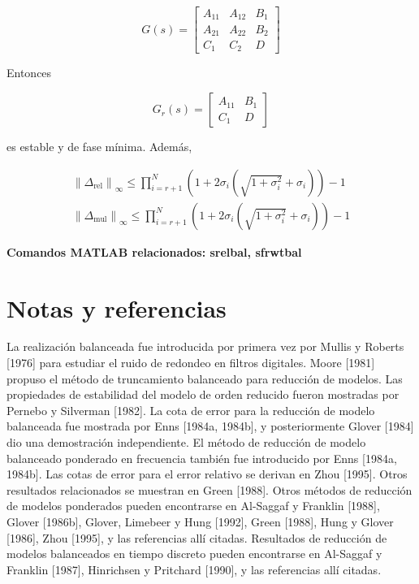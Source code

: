 $$
G(s)=\left[\begin{array}{cc|c}
A_{11} & A_{12} & B_{1} \\
A_{21} & A_{22} & B_{2} \\
\hline C_{1} & C_{2} & D
\end{array}\right]
$$

Entonces

$$
G_{r}(s)=\left[\begin{array}{c|c}
A_{11} & B_{1} \\
\hline C_{1} & D
\end{array}\right]
$$

es estable y de fase mínima. Además,

$$
\begin{gathered}
\left\|\Delta_{\mathrm{rel}}\right\|_{\infty} \leq \prod_{i=r+1}^{N}\left(1+2 \sigma_{i}\left(\sqrt{1+\sigma_{i}^{2}}+\sigma_{i}\right)\right)-1 \\
\left\|\Delta_{\mathrm{mul}}\right\|_{\infty} \leq \prod_{i=r+1}^{N}\left(1+2 \sigma_{i}\left(\sqrt{1+\sigma_{i}^{2}}+\sigma_{i}\right)\right)-1
\end{gathered}
$$

\textbf{Comandos MATLAB relacionados: srelbal, sfrwtbal}

\section{Notas y referencias}
La realización balanceada fue introducida por primera vez por Mullis y Roberts [1976] para estudiar el ruido de redondeo en filtros digitales. Moore [1981] propuso el método de truncamiento balanceado para reducción de modelos. Las propiedades de estabilidad del modelo de orden reducido fueron mostradas por Pernebo y Silverman [1982]. La cota de error para la reducción de modelo balanceada fue mostrada por Enns [1984a, 1984b], y posteriormente Glover [1984] dio una demostración independiente. El método de reducción de modelo balanceado ponderado en frecuencia también fue introducido por Enns [1984a, 1984b]. Las cotas de error para el error relativo se derivan en Zhou [1995]. Otros resultados relacionados se muestran en Green [1988]. Otros métodos de reducción de modelos ponderados pueden encontrarse en Al-Saggaf y Franklin [1988], Glover [1986b], Glover, Limebeer y Hung [1992], Green [1988], Hung y Glover [1986], Zhou [1995], y las referencias allí citadas. Resultados de reducción de modelos balanceados en tiempo discreto pueden encontrarse en Al-Saggaf y Franklin [1987], Hinrichsen y Pritchard [1990], y las referencias allí citadas.

